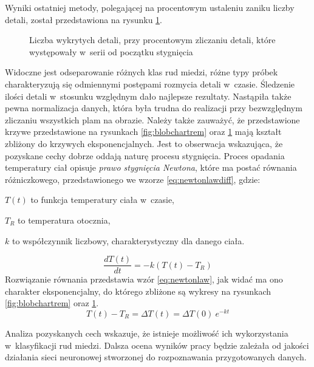 Wyniki ostatniej metody, polegającej na procentowym ustaleniu zaniku liczby
detali, został przedstawiona na rysunku \ref{fig:blobcharperc}.
\begin{figure}[htb]
    \centering
    
    \caption{Liczba wykrytych detali, przy procentowym zliczaniu detali, które
             występowały w~serii od początku stygnięcia}
    \label{fig:blobcharperc}
\end{figure}
Widoczne jest odseparowanie różnych klas rud miedzi, różne typy próbek
charakteryzują się odmiennymi postępami rozmycia detali w~czasie.
Śledzenie ilości detali w~stosunku względnym dało najlepsze rezultaty.
Nastąpiła także pewna normalizacja danych, która była trudna do realizacji
przy bezwzględnym zliczaniu wszystkich plam na obrazie.
Należy także zauważyć, że przedstawione krzywe przedstawione na rysunkach
\ref{fig:blobchartrem} oraz \ref{fig:blobcharperc} mają kształt zbliżony
do krzywych eksponencjalnych.
Jest to obserwacja wskazująca, że pozyskane cechy dobrze oddają naturę procesu
stygnięcia.
Proces opadania temperatury ciał opisuje \emph{prawo stygnięcia Newtona},
które ma postać równania różniczkowego, przedstawionego we wzorze
\ref{eq:newtonlawdiff}, gdzie:
\begin{description}
	\item $ T \left( t \right) $ to funkcja temperatury ciała w~czasie,
	\item $ T_R $ to temperatura otocznia,
	\item $ k $ to współczynnik liczbowy, charakterystyczny dla danego ciała.
\end{description}

\begin{equation}
	\frac{dT \left( t \right)}{dt}=-k\left( T \left( t \right) -T_{R} \right)
\label{eq:newtonlawdiff}
\end{equation}
Rozwiązanie równania przedstawia wzór \ref{eq:newtonlaw}, jak widać ma ono
charakter eksponencjalny, do którego zbliżone są wykresy na rysunkach
\ref{fig:blobchartrem} oraz \ref{fig:blobcharperc}.
\begin{equation}
	T(t) - T_{R} = \Delta T (t) = \Delta T (0) \ e^ {-k t}
\label{eq:newtonlaw}
\end{equation}

Analiza pozyskanych cech wskazuje, że istnieje możliwość ich wykorzystania
w~klasyfikacji rud miedzi.
Dalsza ocena wyników pracy będzie zależała od jakości działania sieci
neuronowej stworzonej do rozpoznawania przygotowanych danych.
